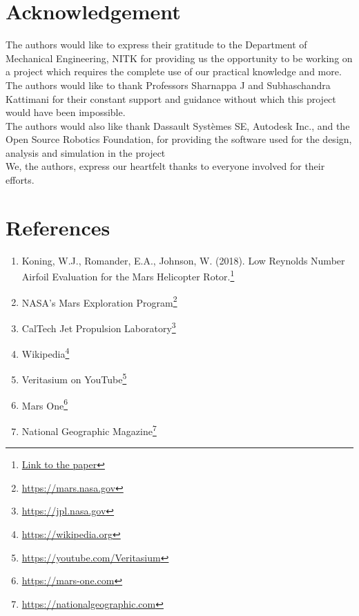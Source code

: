 \documentclass[preprint,12pt]{elsarticle}
\begin{document}
\section*{\textbf{Acknowledgement}}
The authors would like to express their gratitude to the Department of Mechanical Engineering, NITK for providing us the opportunity to be working on a project which requires the complete use of our practical knowledge and more.\\
The authors would like to thank Professors Sharnappa J and Subhaschandra Kattimani for their constant support and guidance without which this project would have been impossible.\\ 
The authors would also like thank Dassault Systèmes SE, Autodesk Inc., and the Open Source Robotics Foundation, for providing the software used for the design, analysis and simulation in the project\\
We, the authors, express our heartfelt thanks to everyone involved for their efforts.\\

\section*{\textbf{References}}
\begin{enumerate}
    \item Koning, W.J., Romander, E.A., Johnson, W. (2018). Low Reynolds Number Airfoil Evaluation for the Mars Helicopter Rotor.\footnote{\href{https://rotorcraft.arc.nasa.gov/Publications/files/Koning_Romander_Johnson_Low_Reynolds_Number_Airfoil_Evaluation_FINAL_ARC.pdf}{Link to the paper}} 
    \item NASA's Mars Exploration Program\footnote{\url{https://mars.nasa.gov}}
    \item CalTech Jet Propulsion Laboratory\footnote{\url{https://jpl.nasa.gov}}
    \item Wikipedia\footnote{\url{https://wikipedia.org}}
    \item Veritasium on YouTube\footnote{\url{https://youtube.com/Veritasium}}
    \item Mars One\footnote{\url{https://mars-one.com}}
    \item National Geographic Magazine\footnote{\url{https://nationalgeographic.com}}
\end{enumerate}
\end{document}
